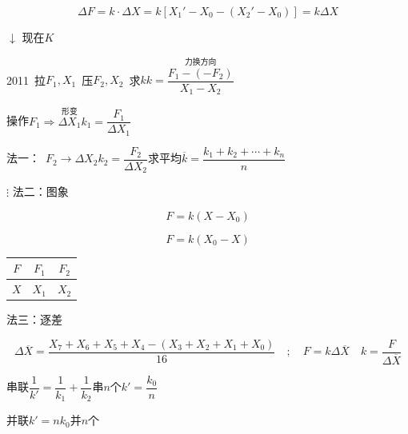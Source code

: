 \[
\Delta F=k\cdot\Delta X=k\left[X_1'-X_0-(X_2'-X_0)\right]=k\Delta X
\]

$\downarrow$ 现在$K$ %

2011\ 拉$F_1,X_1$\ 压$F_2,X_2$\ 求$k$\qquad $k=\dfrac{\overset{\text{力换方向}}{F_1-(-F_2)}}{X_1-X_2}$

操作\quad $F_1\Rightarrow\overset{\text{形变}}{\Delta X_1}$\qquad $k_1=\dfrac{F_1}{\Delta X_1}$

法一：\ $F_2\to\Delta X_2$\qquad $k_2=\dfrac{F_2}{\Delta X_2}$\qquad 求平均$\overline{k}=\dfrac{k_1+k_2+\cdots+k_n}{n}$

$\vdots$
法二：图象
\begin{keybox}
\[F=k(X-X_0)\]
\end{keybox}


\begin{keybox}
\[F=k(X_0-X)\]
\end{keybox}


\begin{center}
\begin{tabular}{c|c|c|}
$F$ & $F_1$ & $F_2$ \\
\hline
$X$ & $X_1$ & $X_2$ \\
\end{tabular}
\end{center}
法三：逐差

\[
\Delta\overline{X}=\frac{X_7+X_6+X_5+X_4-(X_3+X_2+X_1+X_0)}{16}\quad;\quad F=k\Delta\overline{X}\quad k=\frac{F}{\Delta\overline{X}}
\]
\begin{keybox}
串联\quad $\dfrac{1}{k'}=\dfrac{1}{k_1}+\dfrac{1}{k_2}$\qquad 串$n$个\quad $k'=\dfrac{k_0}{n}$

并联\quad $k'=nk_0$\quad 并$n$个
\end{keybox}


